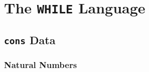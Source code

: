 \section{The {\tt WHILE} Language}
\label{sec:WHILE}
\subsection{{\tt cons} Data} %
\label{sub:cons}
\subsubsection{Natural Numbers} %
\label{ssub:Natural Numbers}


